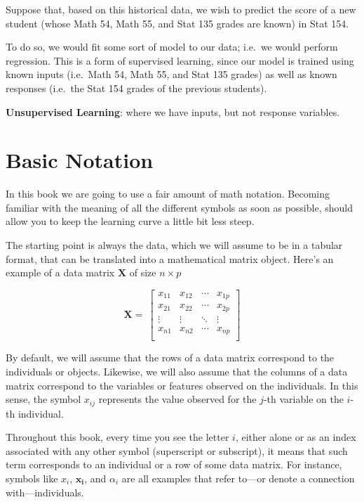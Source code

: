\documentclass[]{book}
\begin{document}
Suppose that, based on this historical data, we wish to predict the score of a
new student (whose Math 54, Math 55, and Stat 135 grades are known) in Stat 154.

To do so, we would fit some sort of model to our data; i.e.~we would perform
regression. This is a form of supervised learning, since our model is trained
using known inputs (i.e.~Math 54, Math 55, and Stat 135 grades) as well as
known responses (i.e.~the Stat 154 grades of the previous students).

\textbf{Unsupervised Learning}: where we have inputs, but not response variables.

\hypertarget{basic-notation}{%
\section{Basic Notation}\label{basic-notation}}

In this book we are going to use a fair amount of math notation. Becoming familiar
with the meaning of all the different symbols as soon as possible, should allow
you to keep the learning curve a little bit less steep.

The starting point is always the data, which we will assume to be in a tabular
format, that can be translated into a mathematical matrix object. Here's an
example of a data matrix \(\mathbf{X}\) of size \(n \times p\)

\[
\mathbf{X} = 
\
\begin{bmatrix} 
x_{11} & x_{12} & \cdots & x_{1p} \\
x_{21} & x_{22} & \cdots & x_{2p} \\
\vdots & \vdots & \ddots & \vdots \\
x_{n1} & x_{n2} & \cdots & x_{np} \\
\end{bmatrix}
\]

By default, we will assume that the rows of a data matrix correspond to the
individuals or objects. Likewise, we will also assume that the columns of a data
matrix correspond to the variables or features observed on the individuals.
In this sense, the symbol \(x_{ij}\) represents the value observed for the \(j\)-th
variable on the \(i\)-th individual.

Throughout this book, every time you see the letter \(i\), either alone or as an
index associated with any other symbol (superscript or subscript), it means
that such term corresponds to an individual or a row of some data matrix.
For instance, symbols like \(x_i\), \(\mathbf{x_i}\), and \(\alpha_i\) are all
examples that refer to---or denote a connection with---individuals.
\end{document}
